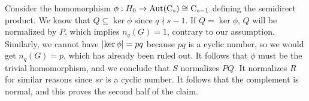 Consider the homomorphism $\phi : H_0 \rightarrow \operatorname{Aut}(\operatorname{C}_{s}) \cong \operatorname{C}_{s - 1}$ defining the semidirect product.
We know that $Q \subseteq \ker \phi$ since $q \nmid s - 1$.
If $Q = \ker \phi$, $Q$ will be normalized by $P$, which implies $n_q(G) = 1$, contrary to our assumption.
Similarly, we cannot have $\lvert\ker \phi\rvert = pq$ because $pq$ is a cyclic number, so we would get $n_q(G) = p$, which has already been ruled out.
It follows that $\phi$ must be the trivial homomorphism, and we conclude that $S$ normalizes $PQ$.
It normalizes $R$ for similar reasons since $sr$ is a cyclic number.
 It follows that the complement is normal, and this proves the second half of the claim.
